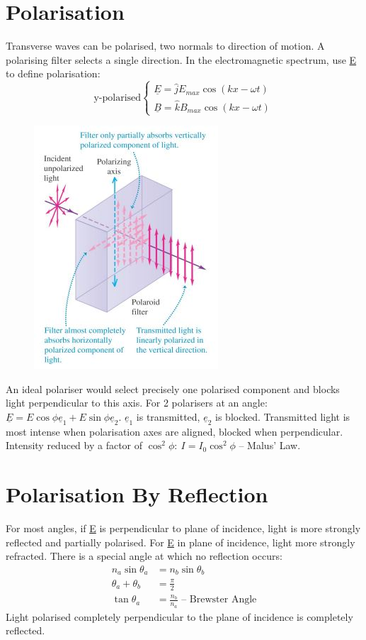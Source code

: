 \documentclass[a4paper, 11pt, normalem]{report}
\begin{document}
\section{Polarisation}
Transverse waves can be polarised, two normals to direction of motion.
A polarising filter selects a single direction.
In the electromagnetic spectrum, use \underline{E} to define polarisation:
\begin{equation}
    \text{y-polarised}
    \begin{cases}
        \underline{E} = \hat{j}E_{max}\cos{(kx - \omega t)} \\
        \underline{B} = \hat{k}B_{max}\cos{(kx - \omega t)}
    \end{cases}
\end{equation}
\begin{figure}[H]
    \centering
    \includegraphics[scale=0.8]{Polarisation.jpg}
\end{figure}
An ideal polariser would select precisely one polarised component and blocks light perpendicular to this axis.
For 2 polarisers at an angle: $\underline{E} = E\cos{\phi}\underline{e}_{1} + E\sin{\phi}\underline{e}_{2}$.
$\underline{e}_{1}$ is transmitted, $\underline{e}_{2}$ is blocked.
Transmitted light is most intense when polarisation axes are aligned, blocked when perpendicular.
Intensity reduced by a factor of $\cos^{2}{\phi}:~I = I_{0}\cos^{2}{\phi}$ -- Malus' Law.

\section{Polarisation By Reflection}
For most angles, if \underline{E} is perpendicular to plane of incidence, light is more strongly reflected and partially polarised.
For \underline{E} in plane of incidence, light more strongly refracted.
There is a special angle at which no reflection occurs:
\begin{align}
    n_{a}\sin{\theta_{a}} &= n_{b}\sin{\theta_{b}} \\
    \theta_{a} + \theta_{b} &= \frac{\pi}{2} \\
    \tan{\theta_{a}} &= \frac{n_{b}}{n_{a}}\text{ -- Brewster Angle}
\end{align}
Light polarised completely perpendicular to the plane of incidence is completely reflected.
\end{document}
